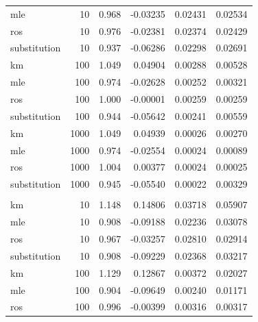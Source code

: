 \documentclass[12pt, twoside]{amherstthesis}
\begin{document}
\begin{table}
\begin{tabular}[t]{lrrrrr}
\hspace{1em}mle & 10 & 0.968 & -0.03235 & 0.02431 & 0.02534\\
\hspace{1em}ros & 10 & 0.976 & -0.02381 & 0.02374 & 0.02429\\
\hspace{1em}substitution & 10 & 0.937 & -0.06286 & 0.02298 & 0.02691\\
\hspace{1em}km & 100 & 1.049 & 0.04904 & 0.00288 & 0.00528\\
\hspace{1em}mle & 100 & 0.974 & -0.02628 & 0.00252 & 0.00321\\
\hspace{1em}ros & 100 & 1.000 & -0.00001 & 0.00259 & 0.00259\\
\hspace{1em}substitution & 100 & 0.944 & -0.05642 & 0.00241 & 0.00559\\
\hspace{1em}km & 1000 & 1.049 & 0.04939 & 0.00026 & 0.00270\\
\hspace{1em}mle & 1000 & 0.974 & -0.02554 & 0.00024 & 0.00089\\
\hspace{1em}ros & 1000 & 1.004 & 0.00377 & 0.00024 & 0.00025\\
\hspace{1em}substitution & 1000 & 0.945 & -0.05540 & 0.00022 & 0.00329\\
\addlinespace[1em]
\multicolumn{6}{l}{\textbf{Censoring Rate = 0.5}}\\
\hspace{1em}km & 10 & 1.148 & 0.14806 & 0.03718 & 0.05907\\
\hspace{1em}mle & 10 & 0.908 & -0.09188 & 0.02236 & 0.03078\\
\hspace{1em}ros & 10 & 0.967 & -0.03257 & 0.02810 & 0.02914\\
\hspace{1em}substitution & 10 & 0.908 & -0.09229 & 0.02368 & 0.03217\\
\hspace{1em}km & 100 & 1.129 & 0.12867 & 0.00372 & 0.02027\\
\hspace{1em}mle & 100 & 0.904 & -0.09649 & 0.00240 & 0.01171\\
\hspace{1em}ros & 100 & 0.996 & -0.00399 & 0.00316 & 0.00317\\

\end{tabular}
\end{table}
\end{document}
